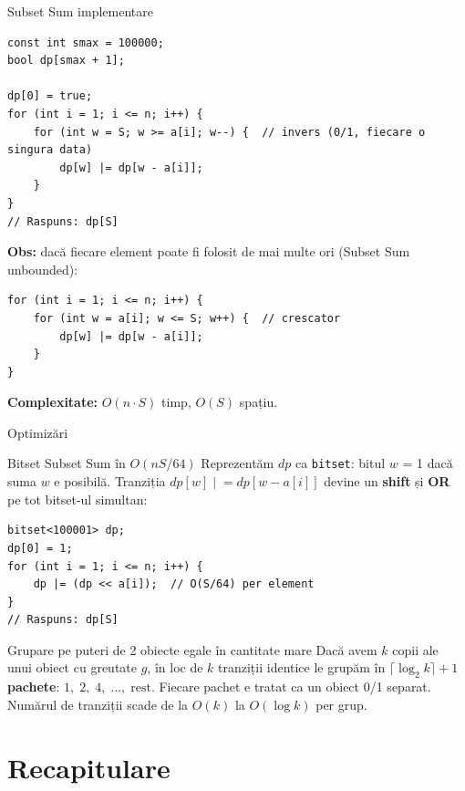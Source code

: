 \documentclass[10pt]{beamer}
\begin{document}
\begin{frame}[fragile]{Subset Sum \textemdash{} implementare}
  \begin{lstlisting}
const int smax = 100000;
bool dp[smax + 1];

dp[0] = true;
for (int i = 1; i <= n; i++) {
    for (int w = S; w >= a[i]; w--) {  // invers (0/1, fiecare o singura data)
        dp[w] |= dp[w - a[i]];
    }
}
// Raspuns: dp[S]
  \end{lstlisting}
  \smallskip
  \textbf{Obs:} dacă fiecare element poate fi folosit de mai multe ori (Subset Sum unbounded):
  \begin{lstlisting}
for (int i = 1; i <= n; i++) {
    for (int w = a[i]; w <= S; w++) {  // crescator
        dp[w] |= dp[w - a[i]];
    }
}
  \end{lstlisting}
  \textbf{Complexitate:} $O(n \cdot S)$ timp, $O(S)$ spațiu.
\end{frame}

\begin{frame}[fragile]{Optimizări}
  \begin{block}{Bitset \textemdash{} Subset Sum în $O(nS/64)$}
    Reprezentăm $dp$ ca \texttt{bitset}: bitul $w$ = 1 dacă suma $w$ e posibilă.
    Tranziția $dp[w] \mathrel{|}= dp[w - a[i]]$ devine un \textbf{shift} și \textbf{OR}
    pe tot bitset-ul simultan:
  \end{block}
  \begin{lstlisting}
bitset<100001> dp;
dp[0] = 1;
for (int i = 1; i <= n; i++) {
    dp |= (dp << a[i]);  // O(S/64) per element
}
// Raspuns: dp[S]
  \end{lstlisting}
  \begin{block}{Grupare pe puteri de 2 \textemdash{} obiecte egale în cantitate mare}
    Dacă avem $k$ copii ale unui obiect cu greutate $g$, în loc de $k$ tranziții identice
    le grupăm în $\lceil \log_2 k \rceil + 1$ \textbf{pachete}: $1,\; 2,\; 4,\;\ldots,\;\text{rest}$.
    Fiecare pachet e tratat ca un obiect 0/1 separat.
    Numărul de tranziții scade de la $O(k)$ la $O(\log k)$ per grup.
  \end{block}
\end{frame}

\section{Recapitulare}
\end{document}
